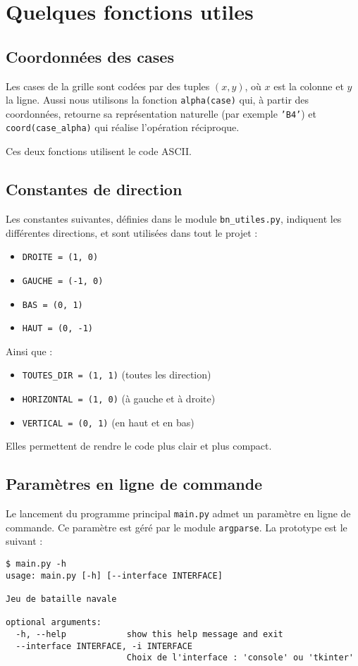 \chapter{Quelques fonctions utiles}

\section{Coordonnées des cases}
Les cases de la grille sont codées par des tuples $(x,y)$, où $x$ est la colonne et $y$ la ligne. Aussi nous utilisons la fonction \texttt{alpha(case)} qui, à partir des coordonnées, retourne sa représentation naturelle (par exemple \texttt{'B4'}) et \texttt{coord(case\_alpha)} qui réalise l'opération réciproque.

Ces deux fonctions utilisent le code ASCII.

\section{Constantes de direction}
Les constantes suivantes, définies dans le module \texttt{bn\_utiles.py}, indiquent les différentes directions, et sont utilisées dans tout le projet :
\begin{itemize}
\item \texttt{DROITE = (1, 0)}
\item \texttt{GAUCHE = (-1, 0)}
\item \texttt{BAS = (0, 1)}
\item \texttt{HAUT = (0, -1)}
\end{itemize}
Ainsi que :
\begin{itemize}
\item \texttt{TOUTES\_DIR = (1, 1)} (toutes les direction)
\item \texttt{HORIZONTAL = (1, 0)} (à gauche et à droite)
\item \texttt{VERTICAL = (0, 1)} (en haut et en bas)
\end{itemize}
Elles permettent de rendre le code plus clair et plus compact.

\section{Paramètres en ligne de commande}
Le lancement du programme principal \texttt{main.py} admet un paramètre en ligne de commande. Ce paramètre est géré par le module \texttt{argparse}. La prototype est le suivant :

\begin{verbatim}
$ main.py -h
usage: main.py [-h] [--interface INTERFACE]

Jeu de bataille navale

optional arguments:
  -h, --help            show this help message and exit
  --interface INTERFACE, -i INTERFACE
                        Choix de l'interface : 'console' ou 'tkinter'
\end{verbatim}